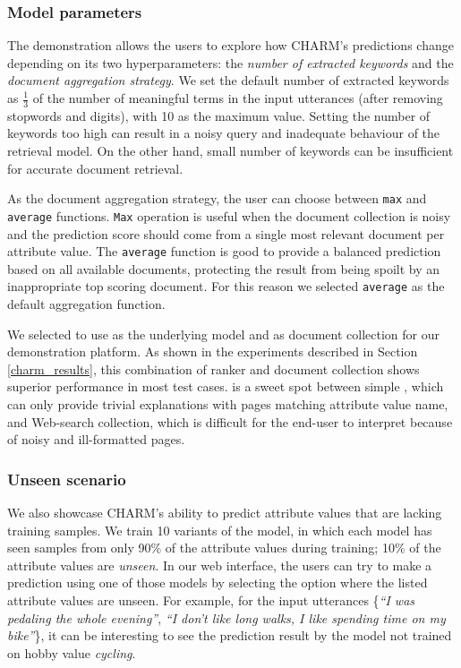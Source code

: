 \subsubsection{Model parameters} 
The demonstration allows the users to explore how CHARM's predictions change depending on its two hyperparameters: the \emph{number of extracted keywords} and the \emph{document aggregation strategy}. 
We set the default number of extracted keywords as $\frac{1}{3}$ of the number of meaningful terms in the input utterances (after removing stopwords and digits), 
with 10 as the maximum value.
Setting the number of keywords too high can result in a noisy query and inadequate behaviour of the retrieval model. 
On the other hand, small number of keywords can be insufficient for accurate document retrieval.

As the document aggregation strategy, the user can choose between \texttt{max} and \texttt{average} functions. \texttt{Max} operation is useful when the document collection is noisy and the prediction score should come from a single most relevant document per attribute value. The \texttt{average} function is good to provide a balanced prediction based on all available documents, protecting the result from being spoilt by an inappropriate top scoring document. For this reason we selected \texttt{average} as the default aggregation function.

We selected to use  as the underlying model and  as document collection for our demonstration platform. As shown in the experiments described in Section \ref{charm_results}, this combination of ranker and document collection shows superior performance in most test cases.  is a sweet spot between simple , which can only provide trivial explanations with pages matching attribute value name, and Web-search collection, which is difficult for the end-user to interpret because of noisy and ill-formatted pages. %
 
\subsubsection{Unseen scenario} 
We also showcase CHARM's ability to predict attribute values
that are lacking training samples.
We train 10 variants of the model, in which each model has seen samples from only 90\% of the attribute values during training; 10\% of the attribute values are \emph{unseen}. 
In our web interface, the users can try to make a prediction using one of those models
by selecting the option where the listed attribute values are unseen. 
For example, for the input utterances \{\emph{``I was pedaling the whole evening''}, \emph{``I don't like long walks, I like spending time on my bike''}\}, it can be interesting to see the prediction result by the model not trained on hobby value \emph{cycling}. 

